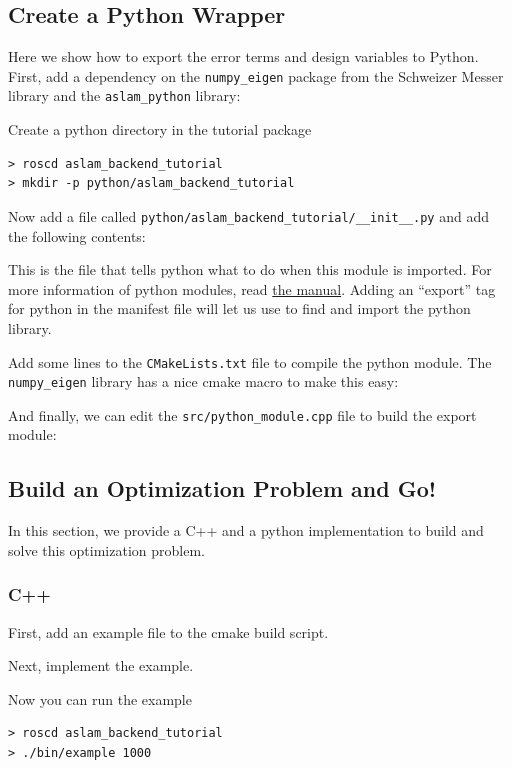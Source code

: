 \documentclass[11pt,a4,oneside]{article}
\newcommand{\txt}[1]{{\footnotesize\texttt{#1}}}
\newcommand{\rospack}[1]{\href{http://www.ros.org/wiki/#1}{{\rosfont{#1}}}}
\newcommand{\listcpp}[2]{}
\newcommand{\listcpprange}[4]{}
\newcommand{\listxmlrange}[4]{}
\begin{document}
\subsection{Create a Python Wrapper}
Here we show how to export the error terms and design variables to Python. First, add a dependency on the \txt{numpy\_eigen} package from the Schweizer Messer library and the \txt{aslam\_python} library:
\listxmlrange{manifest.xml}{../../aslam_backend_tutorial/manifest.xml}{14}{16}
Create a python directory in the tutorial package
\begin{lstlisting}
> roscd aslam_backend_tutorial
> mkdir -p python/aslam_backend_tutorial
\end{lstlisting}
Now add a file called \txt{python/aslam\_backend\_tutorial/\_\_init\_\_.py} and add the following contents:
\listcpp{python/aslam\_backend\_tutorial/\_\_init\_\_.py}{../../aslam_backend_tutorial/python/aslam_backend_tutorial/__init__.py}
This is the file that tells python what to do when this module is imported. For more information of python modules, read \href{http://docs.python.org/tutorial/modules.html}{the manual}.
Adding an ``export'' tag for python in the manifest file will let us use \rospack{roslib} to find and import the python library.
\listxmlrange{manifest.xml}{../../aslam_backend_tutorial/manifest.xml}{17}{21}
Add some lines to the \txt{CMakeLists.txt} file to compile the python module. The \txt{numpy\_eigen} library has a nice cmake macro to make this easy:
\listcpprange{CMakeLists.txt}{../../aslam_backend_tutorial/CMakeLists.txt}{40}{49}
And finally, we can edit the \txt{src/python\_module.cpp} file to build the export module:
\listcpp{src/python\_module.cpp}{../../aslam_backend_tutorial/src/python_module.cpp}
\subsection{Build an Optimization Problem and Go!}
In this section, we provide a C++ and a python implementation to build and solve this optimization problem.
\subsubsection{C++}
First, add an example file to the cmake build script.
\listcpprange{CMakeLists.txt}{../../aslam_backend_tutorial/CMakeLists.txt}{52}{59}
Next, implement the example.
\listcpp{src/example.cpp}{../../aslam_backend_tutorial/src/example.cpp}
Now you can run the example
\begin{lstlisting}
> roscd aslam_backend_tutorial
> ./bin/example 1000
\end{lstlisting}
\end{document}
